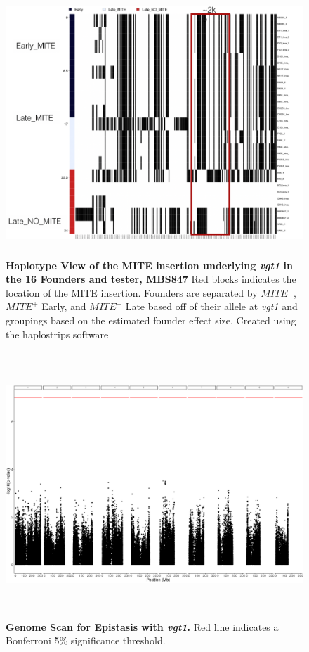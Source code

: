 \documentclass[9pt,twocolumn,twoside]{gsag3jnl}
\begin{document}
\begin{figure}[ht]
\centering
\includegraphics[width=16cm,height=10cm]{figures/mite_founder_haps.png}
\caption{\textbf{Haplotype View of the MITE insertion underlying \emph{vgt1} in the 16 Founders and tester, MBS847} Red blocks indicates the location of the MITE insertion. Founders are separated by $MITE^-$, $MITE^+$ Early, and $MITE^+$ Late based off of their allele at \emph{vgt1} and groupings based on the estimated founder effect size. Created using the haplostrips software \citep{Marnetto}}
\label{fig:supfigure14}
\end{figure}

\begin{figure}[ht]
\centering
\includegraphics[width=16cm,height=10cm]{figures/vgt1_epistasis_scan.png}
\caption{\textbf{Genome Scan for Epistasis with \emph{vgt1}.} Red line indicates a Bonferroni 5\% significance threshold.}
\label{fig:supfigure12}
\end{figure}
\end{document}
